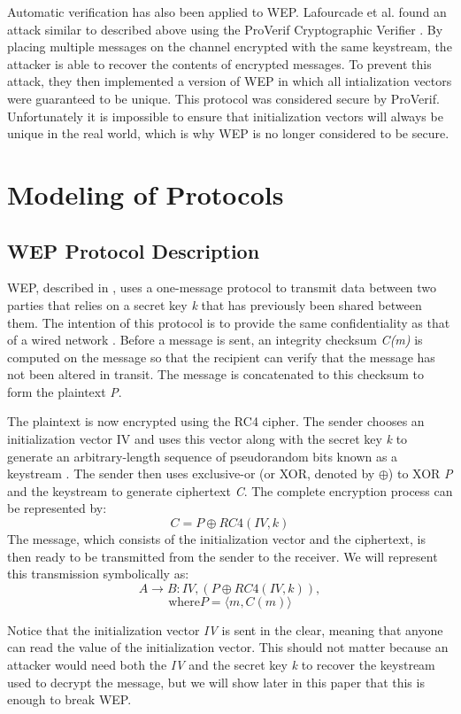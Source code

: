 \documentclass[11pt, twocolumn]{article} %
\begin{document}
Automatic verification has also been applied to WEP.  Lafourcade et al. found an attack similar to \cite{borisov01} described above using the ProVerif Cryptographic Verifier \cite{lafourcade10}. By placing multiple messages on the channel encrypted with the same keystream, the attacker is able to recover the contents of encrypted messages.  To prevent this attack, they then implemented a version of WEP in which all intialization vectors were guaranteed to be unique.  This protocol was considered secure by ProVerif.  Unfortunately it is impossible to ensure that initialization vectors will always be unique in the real world, which is why WEP is no longer considered to be secure.
 
\section{Modeling of Protocols}
\label{sec:model}
\subsection{WEP Protocol Description}
\label{sec:WEP Desc}
WEP, described in \cite{borisov01}, uses a one-message protocol to transmit data between two parties that relies on a secret key \textit{k} that has previously been shared between them.  The intention of this protocol is to provide the same confidentiality as that of a wired network \cite{IEEE802.11}.  Before a message is sent, an integrity checksum \textit{C(m)} is computed on the message so that the recipient can verify that the message has not been altered in transit.  The message is concatenated to this checksum to form the plaintext \textit{P}.

The plaintext is now encrypted using the RC4 cipher.  The sender chooses an initialization vector IV and uses this vector along with the secret key \textit{k} to generate an arbitrary-length sequence of pseudorandom bits known as a keystream \cite{spore}.  The sender then uses exclusive-or (or XOR, denoted by $\oplus$) to XOR \textit{P} and the keystream to generate ciphertext \textit{C}.  The complete encryption process can be represented by: 
$$C = P \oplus RC4(IV, k)$$
The message, which consists of the initialization vector and the ciphertext, is then ready to be transmitted from the sender to the receiver.  We will represent this transmission symbolically as:
$$A \rightarrow B: IV, (P \oplus RC4(IV, k)),$$
$$ \text{where} P = \langle m, C(m) \rangle$$ 

Notice that the initialization vector \textit{IV} is sent in the clear, meaning that anyone can read the value of the initialization vector.  This should not matter because an attacker would need both the \textit{IV} and the secret key \textit{k} to recover the keystream used to decrypt the message, but we will show later in this paper that this is enough to break WEP.
\end{document}
